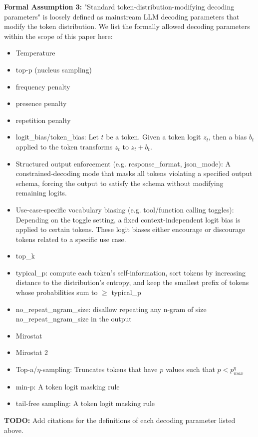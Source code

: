 \documentclass{article}
\begin{document}
\textbf{Formal Assumption 3:} "Standard token-distribution-modifying decoding parameters" is loosely defined as mainstream LLM decoding parameters that modify the token distribution. We list the formally allowed decoding parameters within the scope of this paper here:
\begin{itemize}
\item Temperature
\item top-p (nucleus sampling)
\item frequency penalty
\item presence penalty
\item repetition penalty
\item logit\_bias/token\_bias: Let $\displaystyle t$ be a token. Given a token logit $\displaystyle z_{t}$, then a bias $\displaystyle b_{t}$ applied to the token transforms $\displaystyle z_{t}$ to $\displaystyle z_{t} +b_{t}$.
\item Structured output enforcement (e.g. response\_format, json\_mode): A constrained-decoding mode that masks all tokens violating a specified output schema, forcing the output to satisfy the schema without modifying remaining logits.
\item Use-case-specific vocabulary biasing (e.g. tool/function calling toggles): Depending on the toggle setting, a fixed context-independent logit bias is applied to certain tokens. These logit biases either encourage or discourage tokens related to a specific use case.
\item top\_k
\item typical\_p: compute each token's self-information, sort tokens by increasing distance to the distribution's entropy, and keep the smallest prefix of tokens whose probabilities sum to $\geqslant$ typical\_p
\item no\_repeat\_ngram\_size: disallow repeating any n-gram of size no\_repeat\_ngram\_size in the output
\item Mirostat
\item Mirostat 2
\item Top-a/$\displaystyle \eta $-sampling: Truncates tokens that have $\displaystyle p$ values such that $\displaystyle p< p_{max}^{\eta }$
\item min-p: A token logit masking rule
\item tail-free sampling: A token logit masking rule
\end{itemize}



\textbf{TODO:} Add citations for the definitions of each decoding parameter listed above.
\end{document}
